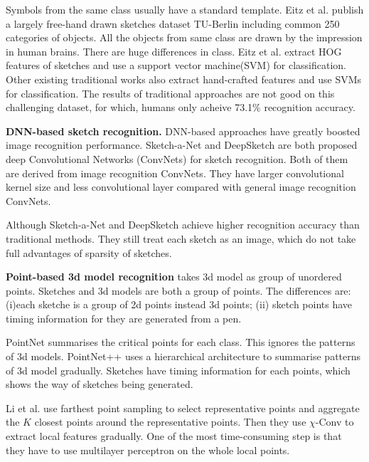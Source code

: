 Symbols from the same class usually have a standard template. Eitz et al. \cite{Eitz2012HowDH} publish a largely free-hand drawn sketches dataset TU-Berlin including common 250 categories of objects. All the objects from same class are drawn by the impression in human brains. There are huge differences in class. Eitz et al. extract HOG features of sketches and use a support vector machine(SVM) for classification. Other existing traditional works \cite{LiHSG15, Schneider2014SketchCA} also extract hand-crafted features and use SVMs for classification. The results of traditional approaches are not good on this challenging dataset, for which, humans only acheive 73.1\% recognition accuracy.

\textbf{DNN-based sketch recognition.} DNN-based approaches have greatly boosted image recognition performance. Sketch-a-Net \cite{Yu2015SketchaNetTB} and DeepSketch \cite{Seddati2015DeepSketchDC} are both proposed deep Convolutional Networks (ConvNets) for sketch recognition. Both of them are derived from image recognition ConvNets. They have larger convolutional kernel size and less convolutional layer compared with general image recognition ConvNets.

Although Sketch-a-Net \cite{Yu2015SketchaNetTB} and DeepSketch \cite{Seddati2015DeepSketchDC} achieve higher recognition accuracy than traditional methods. They still treat each sketch as an image, which do not take full advantages of sparsity of sketches.

\textbf{Point-based 3d model recognition} takes 3d model as group of unordered points. Sketches and 3d models are both a group of points. The differences are: (i)each sketche is a group of 2d points instead 3d points; (ii) sketch points have timing information for they are generated from a pen.

PointNet \cite{qi2017pointnet} summarises the critical points for each class. This ignores the patterns of 3d models. PointNet++ \cite{qi2017pointnetplusplus} uses a hierarchical architecture to summarise patterns of 3d model gradually. Sketches have timing information for each points, which shows the way of sketches being generated.

Li et al. \cite{1801.07791} use farthest point sampling to select representative points and  aggregate the $K$ closest points around the representative points. Then they use $\chi$-Conv to extract local features gradually. One of the most time-consuming step is that they have to use multilayer perceptron on the whole local points.

